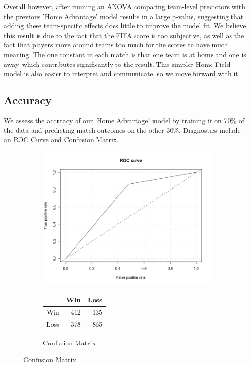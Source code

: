 \documentclass{article}
\begin{document}
Overall however, after running an ANOVA comparing team-level predictors with the previous 'Home Advantage' model results in a large p-value, suggesting that adding these team-specific effects does little to improve the model fit. We believe this result is due to the fact that the FIFA score is too subjective, as well as the fact that players move around teams too much for the scores to have much meaning. The one constant in each match is that one team is at home and one is away, which contributes significantly to the result. This simpler Home-Field model is also easier to interpret and communicate, so we move forward with it.

\subsection{Accuracy}

We assess the accuracy of our 'Home Advantage' model by training it on 70\% of the data and predicting match outcomes on the other 30\%. Diagnostics include an ROC Curve and Confusion Matrix.

\begin{figure}[H]
\centering
\begin{subfigure}{.5\textwidth}
\centering
\includegraphics[width=.7\linewidth]{figures/roccurve.png}
\label{fig:sub1}
\end{subfigure}%
\begin{subfigure}{.3\textwidth}
\centering
\begin{tabular}{rrr}
  \hline
 & Win &  Loss \\ 
  \hline
Win  & 412 & 135  \\
Loss & 378 & 865  \\
   \hline
\end{tabular}
\caption{Confusion Matrix}
\end{subfigure}
\end{figure}
\end{document}

